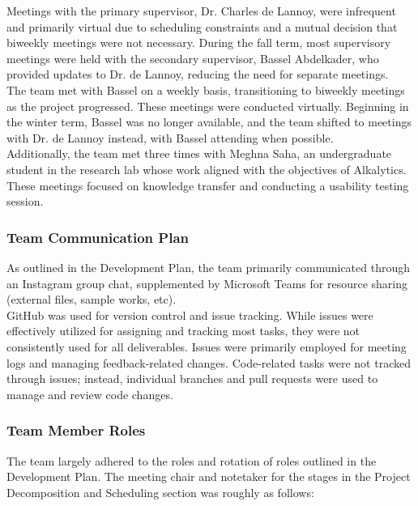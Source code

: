 \documentclass{article}
\begin{document}
Meetings with the primary supervisor, Dr. Charles de Lannoy, were infrequent and
primarily virtual due to scheduling constraints and a mutual decision that
biweekly meetings were not necessary. During the fall term, most supervisory
meetings were held with the secondary supervisor, Bassel Abdelkader, who
provided updates to Dr. de Lannoy, reducing the need for separate meetings. \\

The team met with Bassel on a weekly basis, transitioning to biweekly meetings
as the project progressed. These meetings were conducted virtually. Beginning in
the winter term, Bassel was no longer available, and the team shifted to
meetings with Dr. de Lannoy instead, with Bassel attending when possible. \\

Additionally, the team met three times with Meghna Saha, an undergraduate
student in the research lab whose work aligned with the objectives of
Alkalytics. These meetings focused on knowledge transfer and conducting a
usability testing session.

\subsubsection{Team Communication Plan}
As outlined in the Development Plan, the team primarily communicated through an
Instagram group chat, supplemented by Microsoft Teams for resource sharing
(external files, sample works, etc). \\

GitHub was used for version control and issue tracking. While issues were
effectively utilized for assigning and tracking most tasks, they were not
consistently used for all deliverables. Issues were primarily employed for
meeting logs and managing feedback-related changes. Code-related tasks were not
tracked through issues; instead, individual branches and pull requests were used
to manage and review code changes.

\subsubsection{Team Member Roles}
The team largely adhered to the roles and rotation of roles outlined in the
Development Plan. The meeting chair and notetaker for the stages in the Project
Decomposition and Scheduling section was roughly as follows:
\end{document}
